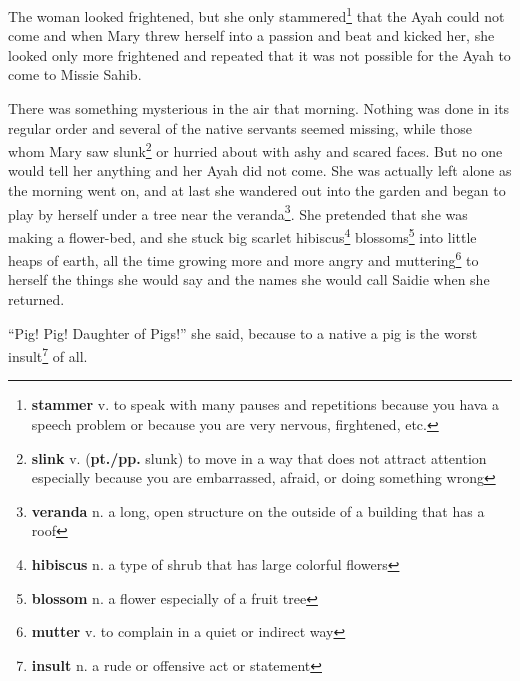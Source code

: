 The woman looked frightened, but she only stammered\footnote{\textbf{stammer} v. to speak with many pauses and repetitions because you hava a speech problem or because you are very nervous, firghtened, etc.} that the Ayah could not come and when Mary threw herself into a passion and beat and kicked her, she looked only more frightened and repeated that it was not possible for the Ayah to come to Missie Sahib.

There was something mysterious in the air that morning. Nothing was done in its regular order and several of the native servants seemed missing, while those whom Mary saw slunk\footnote{\textbf{slink} v. (\textbf{pt./pp.} slunk) to move in a way that does not attract attention especially because you are embarrassed, afraid, or doing something wrong} or hurried about with ashy and scared faces. But no one would tell her anything and her Ayah did not come. She was actually left alone as the morning went on, and at last she wandered out into the garden and began to play by herself under a tree near the veranda\footnote{\textbf{veranda} n. a long, open structure on the outside of a building that has a roof}. She pretended that she was making a flower-bed, and she stuck big scarlet hibiscus\footnote{\textbf{hibiscus} n. a type of shrub that has large colorful flowers} blossoms\footnote{\textbf{blossom} n. a flower especially of a fruit tree} into little heaps of earth, all the time growing more and more angry and muttering\footnote{\textbf{mutter} v. to complain in a quiet or indirect way} to herself the things she would say and the names she would call Saidie when she returned.

``Pig! Pig! Daughter of Pigs!'' she said, because to a native a pig is the worst insult\footnote{\textbf{insult} n. a rude or offensive act or statement} of all.

